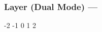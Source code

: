 \subsubsection[Layer (Dual)]{Layer (Dual Mode) --- \UiKey{\SET}}







































-2
-1
0
1
2
